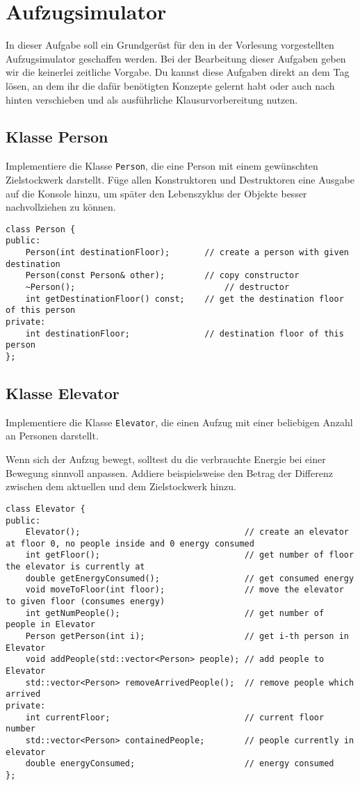 \section{Aufzugsimulator}
In dieser Aufgabe soll ein Grundgerüst für den in der Vorlesung vorgestellten Aufzugsimulator geschaffen werden.
Bei der Bearbeitung dieser Aufgaben geben wir die keinerlei zeitliche Vorgabe.
Du kannst diese Aufgaben direkt an dem Tag lösen, an dem ihr die dafür benötigten Konzepte gelernt habt oder auch nach hinten verschieben und als ausführliche Klausurvorbereitung nutzen.

\subsection{Klasse Person}
Implementiere die Klasse \lstinline{Person}, die eine Person mit einem gewünschten Zielstockwerk darstellt.
Füge allen Konstruktoren und Destruktoren eine Ausgabe auf die Konsole hinzu, um später den Lebenszyklus der Objekte besser nachvollziehen zu können.

\begin{lstlisting}
class Person {
public:
    Person(int destinationFloor);       // create a person with given destination
    Person(const Person& other);        // copy constructor
    ~Person();                              // destructor
    int getDestinationFloor() const;    // get the destination floor of this person
private:
    int destinationFloor;               // destination floor of this person
};
\end{lstlisting}

\subsection{Klasse Elevator}
Implementiere die Klasse \lstinline{Elevator}, die einen Aufzug mit einer beliebigen Anzahl an Personen darstellt.

Wenn sich der Aufzug bewegt, solltest du die verbrauchte Energie bei einer Bewegung sinnvoll anpassen.
Addiere beispielsweise den Betrag der Differenz zwischen dem aktuellen und dem Zielstockwerk hinzu.

\begin{lstlisting}
class Elevator {
public:
    Elevator();                                 // create an elevator at floor 0, no people inside and 0 energy consumed
    int getFloor();                             // get number of floor the elevator is currently at
    double getEnergyConsumed();                 // get consumed energy
    void moveToFloor(int floor);                // move the elevator to given floor (consumes energy)
    int getNumPeople();                         // get number of people in Elevator
    Person getPerson(int i);                    // get i-th person in Elevator
    void addPeople(std::vector<Person> people); // add people to Elevator
    std::vector<Person> removeArrivedPeople();  // remove people which arrived
private:
    int currentFloor;                           // current floor number
    std::vector<Person> containedPeople;        // people currently in elevator
    double energyConsumed;                      // energy consumed
};
\end{lstlisting}

